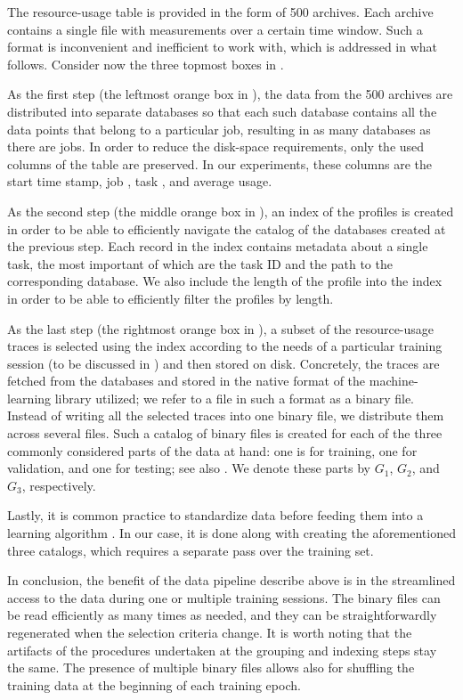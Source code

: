 The resource-usage table is provided in the form of 500 archives. Each archive
contains a single file with measurements over a certain time window. Such a
format is inconvenient and inefficient to work with, which is addressed in what
follows. Consider now the three topmost boxes in .

As the first step (the leftmost orange box in ), the data
from the 500 archives are distributed into separate databases so that each such
database contains all the data points that belong to a particular job, resulting
in as many databases as there are jobs. In order to reduce the disk-space
requirements, only the used columns of the table are preserved. In our
experiments, these columns are the start time stamp, job , task ,
and average  usage.

As the second step (the middle orange box in ), an index
of the profiles is created in order to be able to efficiently navigate the
catalog of the databases created at the previous step. Each record in the index
contains metadata about a single task, the most important of which are the task
ID and the path to the corresponding database. We also include the length of the
profile into the index in order to be able to efficiently filter the profiles by
length.

As the last step (the rightmost orange box in ), a subset
of the resource-usage traces is selected using the index according to the needs
of a particular training session (to be discussed in ) and
then stored on disk. Concretely, the traces are fetched from the databases and
stored in the native format of the machine-learning library utilized; we refer
to a file in such a format as a binary file. Instead of writing all the selected
traces into one binary file, we distribute them across several files. Such a
catalog of binary files is created for each of the three commonly considered
parts \cite{hastie2013} of the data at hand: one is for training, one for
validation, and one for testing; see also . We denote
these parts by $G_1$, $G_2$, and $G_3$, respectively.

Lastly, it is common practice to standardize data before feeding them into a
learning algorithm \cite{hastie2013}. In our case, it is done along with
creating the aforementioned three catalogs, which requires a separate pass over
the training set.

In conclusion, the benefit of the data pipeline describe above is in the
streamlined access to the data during one or multiple training sessions. The
binary files can be read efficiently as many times as needed, and they can be
straightforwardly regenerated when the selection criteria change. It is worth
noting that the artifacts of the procedures undertaken at the grouping and
indexing steps stay the same. The presence of multiple binary files allows also
for shuffling the training data at the beginning of each training epoch.

